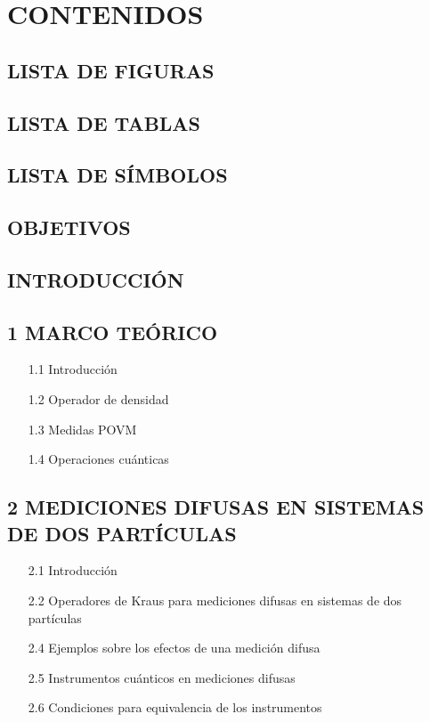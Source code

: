 \chapter{CONTENIDOS}

\section*{LISTA DE FIGURAS}

\section*{LISTA DE TABLAS}

\section*{LISTA DE SÍMBOLOS}

\section*{OBJETIVOS}

\section*{INTRODUCCIÓN}

\section*{1 MARCO TEÓRICO}
\begin{itemize}
\item[1.1] Introducción
\item[1.2] Operador de densidad
\item[1.3] Medidas POVM
\item[1.4] Operaciones cuánticas 
\end{itemize}

\section*{2 MEDICIONES DIFUSAS EN SISTEMAS DE DOS PARTÍCULAS}
\begin{itemize}
\item[2.1] Introducción
\item[2.2] Operadores de Kraus para mediciones difusas en sistemas de dos partículas
\item[2.4] Ejemplos sobre los efectos de una medición difusa
\item[2.5] Instrumentos cuánticos en mediciones difusas
\item[2.6] Condiciones para equivalencia de los instrumentos 
\end{itemize}



